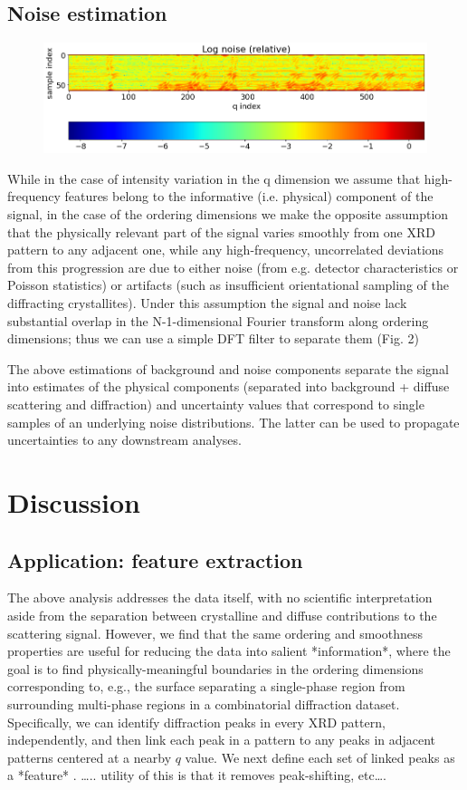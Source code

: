 \documentclass[12pt]{iopart}
\begin{document}
\subsection{Noise estimation}
\begin{figure}
  \includegraphics[width=\linewidth]{figures/noise.png}
  \caption{}
  \label{fig:noise}
\end{figure}
While in the case of intensity variation in the q dimension we assume
that high-frequency features belong to the informative (i.e. physical)
component of the signal, in the case of the ordering dimensions we
make the opposite assumption that the physically relevant part of the
signal varies smoothly from one XRD pattern to any adjacent one, while
any high-frequency, uncorrelated deviations from this progression are
due to either noise (from e.g. detector characteristics or Poisson
statistics) or artifacts (such as insufficient orientational sampling
of the diffracting crystallites). Under this assumption the signal and
noise lack substantial overlap in the N-1-dimensional Fourier transform
along ordering dimensions; thus we can use a simple DFT filter to
separate them (Fig. 2)

The above estimations of background and noise components separate
the signal into estimates of the physical components (separated into
background + diffuse scattering and diffraction) and uncertainty values
that correspond to single samples of an underlying noise distributions.
The latter can be used to propagate uncertainties to any downstream analyses. 

\section{Discussion}
\subsection{Application: feature extraction}
The above analysis addresses the data itself, with no scientific
interpretation aside from the separation between crystalline and diffuse
contributions to the scattering signal. However, we find that the same
ordering and smoothness properties are useful for reducing the data into
salient *information*, where the goal is to find physically-meaningful
boundaries in the ordering dimensions corresponding to, e.g., the
surface separating a single-phase region from surrounding multi-phase
regions in a combinatorial diffraction dataset. Specifically, we can
identify diffraction peaks in every XRD pattern, independently, and then
link each peak in a pattern to any peaks in adjacent patterns centered
at a nearby $q$ value. We next define each set of linked peaks as a
*feature* . ….. utility of this is that it removes peak-shifting,
etc….
\end{document}
